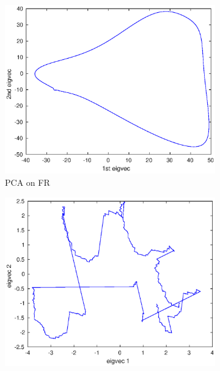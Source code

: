         
        \begin{figure}[H]
        \centering
        \begin{subfigure}[b]{0.475\textwidth}   
            \centering 
            \includegraphics[width=\textwidth]{./images/FinalOralPlots/SyntheticOralPaper/SimFRPCA.eps}
            \caption[]%
             {{\small PCA on FR}}   
            \label{fig:PCA on Prevtime in 3D}
        \end{subfigure}
        \quad
        \begin{subfigure}[b]{0.475\textwidth}   
            \centering 
            \includegraphics[width=\textwidth]{./images/FinalOralPlots/SyntheticOralPaper/SimPrevtimePCA.eps}

\end{subfigure}
\end{figure}

